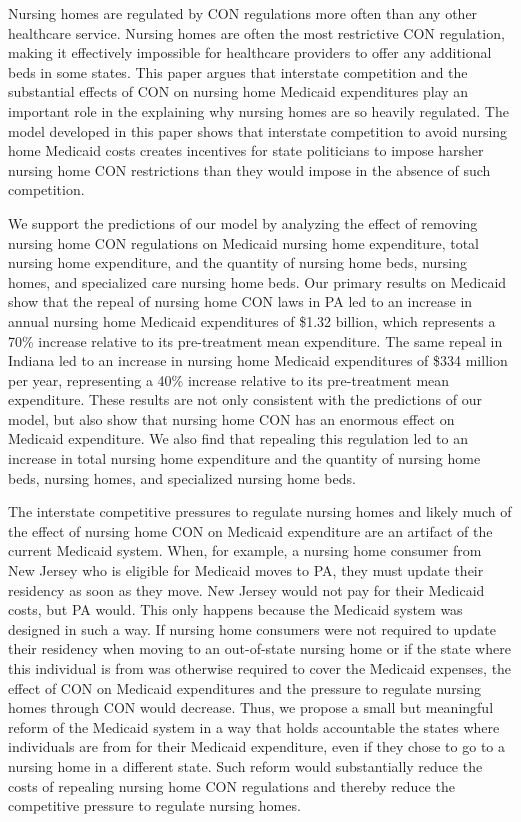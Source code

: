 \documentclass[../Main.tex]{subfiles}
\begin{document}
Nursing homes are regulated by CON regulations more often than any other healthcare service. Nursing homes are often the most restrictive CON regulation, making it effectively impossible for healthcare providers to offer any additional beds in some states. This paper argues that interstate competition and the substantial effects of CON on nursing home Medicaid expenditures play an important role in the explaining why nursing homes are so heavily regulated. The model developed in this paper shows that interstate competition to avoid nursing home Medicaid costs creates incentives for state politicians to impose harsher nursing home CON restrictions than they would impose in the absence of such competition.

We support the predictions of our model by analyzing the effect of removing nursing home CON regulations on Medicaid nursing home expenditure, total nursing home expenditure, and the quantity of nursing home beds, nursing homes, and specialized care nursing home beds. Our primary results on Medicaid show that the repeal of nursing home CON laws in PA led to an increase in annual nursing home Medicaid expenditures of \$1.32 billion, which represents a 70\% increase relative to its pre-treatment mean expenditure. The same repeal in Indiana led to an increase in nursing home Medicaid expenditures of \$334 million per year, representing a 40\% increase relative to its pre-treatment mean expenditure. These results are not only consistent with the predictions of our model, but also show that nursing home CON has an enormous effect on Medicaid expenditure. We also find that repealing this regulation led to an increase in total nursing home expenditure and the quantity of nursing home beds, nursing homes, and specialized nursing home beds.

The interstate competitive pressures to regulate nursing homes and likely much of the effect of nursing home CON on Medicaid expenditure are an artifact of the current Medicaid system. When, for example, a nursing home consumer from New Jersey who is eligible for Medicaid moves to PA, they must update their residency as soon as they move. New Jersey would not pay for their Medicaid costs, but PA would. This only happens because the Medicaid system was designed in such a way. If nursing home consumers were not required to update their residency when moving to an out-of-state nursing home or if the state where this individual is from was otherwise required to cover the Medicaid expenses, the effect of CON on Medicaid expenditures and the pressure to regulate nursing homes through CON would decrease.  Thus, we propose a small but meaningful reform of the Medicaid system in a way that holds accountable the states where individuals are from for their Medicaid expenditure, even if they chose to go to a nursing home in a different state. Such reform would substantially reduce the costs of repealing nursing home CON regulations and thereby reduce the competitive pressure to regulate nursing homes. 
\end{document}
